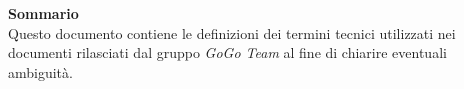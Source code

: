 \begin{center}
	\Large{\textbf{Sommario}}\\

	\normalsize
		Questo documento contiene le definizioni dei termini tecnici utilizzati nei documenti rilasciati dal gruppo \textit{GoGo Team} 
		al fine di chiarire eventuali ambiguità.
\end{center}